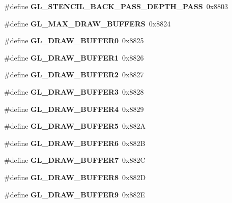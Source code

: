 \begin{DoxyCompactItemize}
\item 
\#define {\bfseries G\+L\+\_\+\+S\+T\+E\+N\+C\+I\+L\+\_\+\+B\+A\+C\+K\+\_\+\+P\+A\+S\+S\+\_\+\+D\+E\+P\+T\+H\+\_\+\+P\+A\+S\+S}~0x8803\label{_s_d_l__opengl_8h_ad9262afb6e71de6b55716ea503b5608c}

\item 
\#define {\bfseries G\+L\+\_\+\+M\+A\+X\+\_\+\+D\+R\+A\+W\+\_\+\+B\+U\+F\+F\+E\+R\+S}~0x8824\label{_s_d_l__opengl_8h_a91ba8bd0010298f5ccacbf675b968040}

\item 
\#define {\bfseries G\+L\+\_\+\+D\+R\+A\+W\+\_\+\+B\+U\+F\+F\+E\+R0}~0x8825\label{_s_d_l__opengl_8h_aa2469283a1f0e9ac2e284fda0986904b}

\item 
\#define {\bfseries G\+L\+\_\+\+D\+R\+A\+W\+\_\+\+B\+U\+F\+F\+E\+R1}~0x8826\label{_s_d_l__opengl_8h_a2d6bd6c745a1de4d1465f593fb9c6490}

\item 
\#define {\bfseries G\+L\+\_\+\+D\+R\+A\+W\+\_\+\+B\+U\+F\+F\+E\+R2}~0x8827\label{_s_d_l__opengl_8h_ab3e702cb6674aec6967dd262580942cb}

\item 
\#define {\bfseries G\+L\+\_\+\+D\+R\+A\+W\+\_\+\+B\+U\+F\+F\+E\+R3}~0x8828\label{_s_d_l__opengl_8h_a72edb5a40dd8de4cedc6bdc8d03f5158}

\item 
\#define {\bfseries G\+L\+\_\+\+D\+R\+A\+W\+\_\+\+B\+U\+F\+F\+E\+R4}~0x8829\label{_s_d_l__opengl_8h_a6dc6a00d55ace50abd475919abe731b0}

\item 
\#define {\bfseries G\+L\+\_\+\+D\+R\+A\+W\+\_\+\+B\+U\+F\+F\+E\+R5}~0x882\+A\label{_s_d_l__opengl_8h_a42b24eef0f5ea7e18cff8280b99fc75a}

\item 
\#define {\bfseries G\+L\+\_\+\+D\+R\+A\+W\+\_\+\+B\+U\+F\+F\+E\+R6}~0x882\+B\label{_s_d_l__opengl_8h_a3ddf0efa0deb687be24a1320b18a951b}

\item 
\#define {\bfseries G\+L\+\_\+\+D\+R\+A\+W\+\_\+\+B\+U\+F\+F\+E\+R7}~0x882\+C\label{_s_d_l__opengl_8h_a0785682bd6abfebf09c7d9824e9e0c5b}

\item 
\#define {\bfseries G\+L\+\_\+\+D\+R\+A\+W\+\_\+\+B\+U\+F\+F\+E\+R8}~0x882\+D\label{_s_d_l__opengl_8h_ab4c4e3ed6fa6175de281ffca5447e44c}

\item 
\#define {\bfseries G\+L\+\_\+\+D\+R\+A\+W\+\_\+\+B\+U\+F\+F\+E\+R9}~0x882\+E\label{_s_d_l__opengl_8h_a2f5f605eddcf20b6e45962a51533d420}


\end{DoxyCompactItemize}
